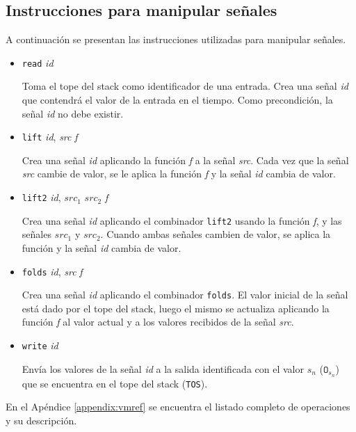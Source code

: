 \subsection{Instrucciones para manipular señales}
  
  A continuación se presentan las instrucciones utilizadas para manipular
señales.
  \begin{itemize}

\item {
    \texttt{read} \textit{id}

      Toma el tope del stack como identificador de una entrada.
      Crea una señal \textit{id} que contendrá el valor de la entrada
    en el tiempo.
      Como precondición, la señal \textit{id} no debe existir.

    
}
\item {
    \texttt{lift} \textit{id}, \textit{src} \textit{f}

      Crea una señal \textit{id} aplicando la función \textit{f}
    a la señal \textit{src}.
      Cada vez que la señal \textit{src} cambie de valor, se le aplica
      la función \textit{f} y la señal \textit{id} cambia de valor.
  
    
}
\item {
  \texttt{lift2} \textit{id}, $\textit{src}_1$ $\textit{src}_2$ \textit{f}

      Crea una señal \textit{id} aplicando el combinador \texttt{lift2}
    usando la función \textit{f}, y las señales $\textit{src}_1$ y
  $\textit{src}_2$.
      Cuando ambas señales cambien de valor, se aplica la función
      y la señal \textit{id} cambia de valor.

    
}
\item {
    \texttt{folds} \textit{id}, \textit{src} \textit{f}

      Crea una señal \textit{id} aplicando el combinador \texttt{folds}.
    El valor inicial de la señal está dado por el tope del stack, luego
    el mismo se actualiza aplicando la función \textit{f} al valor actual
    y a los valores recibidos de la señal \textit{src}.

    
}
\item {
    \texttt{write} \textit{id}

    Envía los valores de la señal \textit{id} a la salida identificada
    con el valor $s_n$ ($\texttt{O}_{s_n}$) que se encuentra en el
    tope del stack (\texttt{TOS}).
    
    
}
\end{itemize}

  En el Apéndice \ref{appendix:vmref} se encuentra el listado completo
  de operaciones y su descripción.
